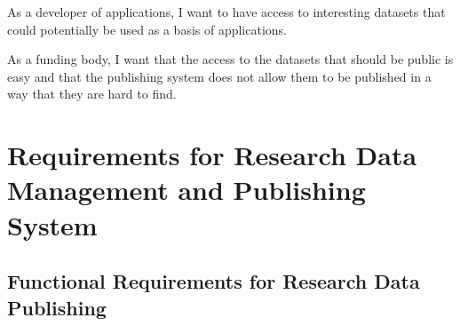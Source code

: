 \begin{compactitem}
    \item As a developer of applications, I want to have access to interesting
          datasets that could potentially be used as a basis of
          applications.
    \item As a funding body, I want that the access to the datasets that
          should be public is easy and that the publishing system does not allow them to
          be published in a way that they are hard to find.
\end{compactitem}

\iffalse
This is the first appendix. You could put some test images or verbose data in an
appendix, if there is too much data to fit in the actual text nicely.

For now, the Aalto logo variants are shown in Figure~\ref{fig:aaltologo}.

\begin{figure}
\begin{center}
 \begin{subfigure}[b]{\textwidth}
  {\selectlanguage{english}\AaltoLogoSmall{1}{!}{aaltoBlue}}
  \caption{In English}
 \end{subfigure}
 \begin{subfigure}[b]{\textwidth}
  {\selectlanguage{finnish}\AaltoLogoSmall{1}{''}{aaltoRed}}
  \caption{Suomeksi}
 \end{subfigure}
 \begin{subfigure}[b]{\textwidth}
  {\selectlanguage{swedish}\AaltoLogoSmall{1}{?}{aaltoYellow}}
  \caption{P\r{a} svenska}
 \end{subfigure}
\caption{Aalto logo variants}
\label{fig:aaltologo}
\end{center}
\end{figure}
\fi

\chapter[Design Requirements]{Requirements for Research Data Management and Publishing System}
\label{chapter:reqs}

\section[Research Data Publishing]{Functional Requirements for Research Data Publishing}

